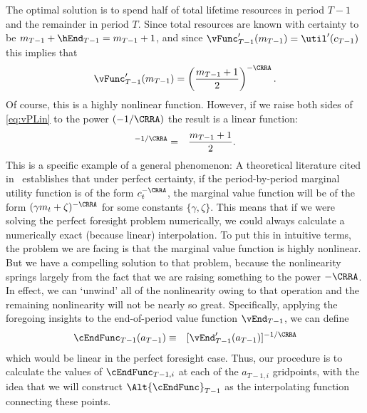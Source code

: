 \documentclass[titlepage]{\econtex}
\begin{document}
The optimal solution is to spend half of total lifetime resources in
period $T-1$ and the remainder in period $T$.  Since total resources
are known with certainty to be
${m}_{T-1}+\hEnd_{T-1}= {m}_{T-1}+1$, and since
${\vFunc}_{T-1}^{\prime}({m}_{T-1}) = \util^{\prime}({c}_{T-1})$ this
implies that 
\begin{equation}
  \vFunc^{\prime}_{T-1}({m}_{T-1})  = \left(\frac{{m}_{T-1}+1}{2}\right)^{-\CRRA} \label{eq:vPLin}.
\end{equation}
Of course, this is a highly nonlinear
function.  However, if we raise both sides of \eqref{eq:vPLin} to the
power $(-1/\CRRA)$ the result is a linear function:
\begin{eqnarray}
  [\vFunc^{\prime}_{T-1}({m}_{T-1})]^{-1/\CRRA} & = & \frac{{m}_{T-1}+1}{2}  .
\end{eqnarray}
This is a specific example of a general phenomenon: A theoretical
literature cited in~\cite{carroll&kimball:concavity} establishes that under
perfect certainty, if the period-by-period marginal utility function
is of the form ${c}_{t}^{-\CRRA}$, the marginal value function will be
of the form $(\gamma {m}_{t}+\zeta)^{-\CRRA}$ for some constants
$\{\gamma,\zeta\}$.  This means that if we were solving the perfect
foresight problem numerically, we could always calculate a numerically
exact (because linear) interpolation.  To put this in intuitive terms,
the problem we are facing is that the marginal value function is
highly nonlinear.  But we have a compelling solution to that problem,
because the nonlinearity springs largely from the fact that we are raising
something to the power $-\CRRA$.  In effect, we can `unwind' all of
the nonlinearity owing to that operation and the remaining
nonlinearity will not be nearly so great.  Specifically, applying the foregoing insights
to the end-of-period value function $\vEnd_{T-1}$, we can define
\begin{eqnarray}
  \cEndFunc_{T-1}({a}_{T-1}) & \equiv & [\vEnd_{T-1}^{\prime}({a}_{T-1})]^{-1/\CRRA} \label{eq:cGoth}
\end{eqnarray}
which would be linear in the perfect foresight case.  Thus, our
procedure is to calculate the values of $\cEndFunc_{T-1,i}$ at each
of the ${a}_{T-1,i}$ gridpoints, with the idea that we will construct
$\Alt{\cEndFunc}_{T-1}$ as the interpolating function connecting
these
points.  %
\end{document}

